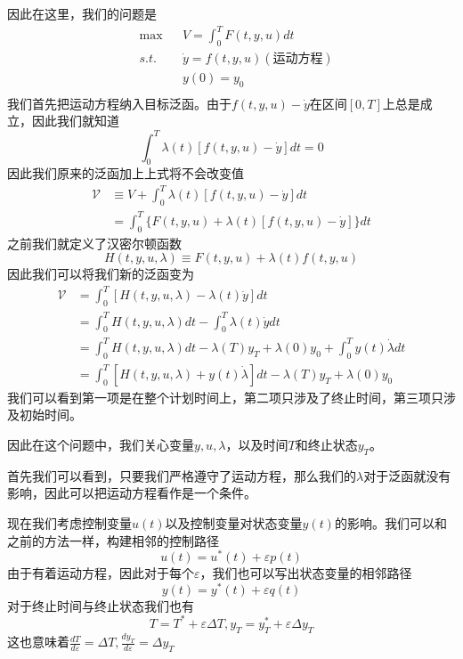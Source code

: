 \documentclass[UTF8,12pt]{ctexart}
\numberwithin{equation}{section} %
\numberwithin{figure}{section}
\numberwithin{table}{section}
\begin{document}
	因此在这里，我们的问题是
	\begin{equation}
		\begin{aligned}
			&\max &&V = \int_{0}^{T}F(t,y,u)dt \\
			&s.t. &&\dot{y} = f(t,y,u) (\text{运动方程}) \\
			&  &&y(0) = y_0 \\ 
		\end{aligned}
	\end{equation}
	我们首先把运动方程纳入目标泛函。由于$f(t,y,u) - \dot{y}$在区间$[0,T]$上总是成立，因此我们就知道
	\begin{equation}
		\int_{0}^{T}\lambda(t)[f(t,y,u) - \dot{y}]dt = 0
	\end{equation}
	因此我们原来的泛函加上上式将不会改变值
	\begin{equation}
		\begin{aligned}
			\mathscr{V} &\equiv V + \int_{0}^{T}\lambda(t)[f(t,y,u) - \dot{y}]dt \\
			&=\int_{0}^{T}\{F(t,y,u) + \lambda(t)[f(t,y,u) - \dot{y}]\}dt
		\end{aligned}
	\end{equation}
	之前我们就定义了汉密尔顿函数
	\begin{equation}
		H(t,y,u,\lambda) \equiv F(t,y,u) + \lambda(t)f(t,y,u)
	\end{equation}
	因此我们可以将我们新的泛函变为
	\begin{equation}
		\begin{aligned}
			\mathscr{V} & = \int_{0}^{T}[H(t,y,u,\lambda) - \lambda(t)\dot{y}]dt \\
			& = \int_{0}^{T}H(t,y,u,\lambda)dt - \int_{0}^{T}\lambda(t)\dot{y}dt \\
			&=\int_{0}^{T}H(t,y,u,\lambda)dt - \lambda(T)y_T + \lambda(0)y_0 + \int_{0}^{T} y(t)\dot{\lambda}dt \\
			&=\int_{0}^{T}[H(t,y,u,\lambda) + y(t)\dot{\lambda}]dt - \lambda(T)y_T + \lambda(0)y_0
		\end{aligned}
	\end{equation}
	我们可以看到第一项是在整个计划时间上，第二项只涉及了终止时间，第三项只涉及初始时间。
	
	因此在这个问题中，我们关心变量$y,u,\lambda$，以及时间$T$和终止状态$y_T$。
	
	首先我们可以看到，只要我们严格遵守了运动方程，那么我们的$\lambda$对于泛函就没有影响，因此可以把运动方程看作是一个条件。
	
	现在我们考虑控制变量$u(t)$以及控制变量对状态变量$y(t)$的影响。我们可以和之前的方法一样，构建相邻的控制路径
	\begin{equation}
		u(t) = u^*(t) + \varepsilon p(t)
	\end{equation}
	由于有着运动方程，因此对于每个$\varepsilon$，我们也可以写出状态变量的相邻路径
	\begin{equation}
		y(t) = y^*(t) + \varepsilon q(t)
	\end{equation}
	对于终止时间与终止状态我们也有
	\begin{equation}
		T = T^* + \varepsilon \Delta T,y_T = y_T^* + \varepsilon \Delta y_T
	\end{equation}
	这也意味着$\frac{dT}{d\varepsilon} = \Delta T,\frac{dy_T}{d\varepsilon} = \Delta y_T$
	
\end{document}
